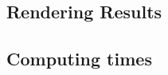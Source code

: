 \documentclass[oneside,a4paper,english,links]{amca}
\begin{document}
\subsection{Rendering Results}
\subsection{Computing times}












\end{document}
